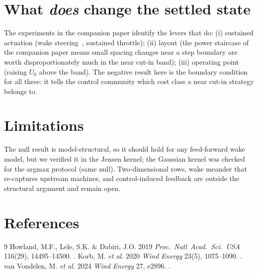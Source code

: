 \documentclass[11pt]{article}
\begin{document}
\section{What \emph{does} change the settled state}

The experiments in the companion paper identify the levers that do: (i) sustained actuation
(wake steering~\cite{Howland2019}, sustained throttle); (ii) layout (the power staircase of
the companion paper means small spacing changes near a step boundary are worth
disproportionately much in the near cut-in band); (iii) operating point (raising $U_0$ above
the band). The negative result here is the boundary condition for all three: it tells the
control community which cost class a near cut-in strategy belongs to.

\section{Limitations}

The null result is model-structural, so it should hold for any feed-forward wake model, but
we verified it in the Jensen kernel; the Gaussian kernel was checked for the argmax protocol
(same null). Two-dimensional rows, wake meander that re-captures upstream machines, and
control-induced feedback are outside the structural argument and remain open.

\section*{References}
\begin{thebibliography}{9}
 Howland, M.F., Lele, S.K. \& Dabiri, J.O. 2019 \emph{Proc.\ Natl\ Acad.\ Sci.\ USA} 116(29), 14495--14500. .
 Korb, M. \emph{et al.} 2020 \emph{Wind Energy} 23(5), 1075--1090. .
 van Vondelen, M. \emph{et al.} 2024 \emph{Wind Energy} 27, e2896. .
\end{thebibliography}
\end{document}
